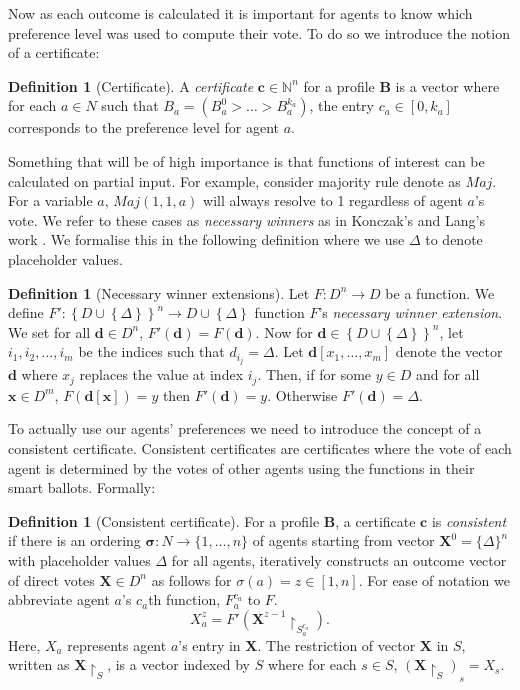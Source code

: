 \documentclass[11pt,a4paper, titlepage]{article}
\theoremstyle{definition}
\newtheorem{definition}[theorem]{Definition}
\let\vec\mathbf
\begin{document}
Now as each outcome is calculated it is important for agents to know which preference level was used to compute their vote. 
To do so we introduce the notion of a certificate:

\begin{definition}[Certificate]
    A \emph{certificate} $\mathbf{c} \in \mathbb{N}^n$ for a profile $\mathbf{B}$ is a vector where for each $a \in N$ such that $B_a = (B_a^0 > \ldots > B_a^{k_a})$, the entry $c_a \in [0, k_a]$ corresponds to the preference level for agent $a$.  
\end{definition}


Something that will be of high importance is that functions of interest can be calculated on partial input.  
For example, consider majority rule denote as $\mathit{Maj}$. For a variable $a$, $\mathit{Maj}(1, 1, a)$ will always resolve to 1 regardless of agent $a$'s vote. 
We refer to these cases as \emph{necessary winners} as in Konczak's and Lang's work \cite{konczak2005voting}.
We formalise this in the following definition where we use $\Delta$ to denote placeholder values.

\begin{definition}[Necessary winner extensions]
    Let $F \colon D^n \longrightarrow D $ be a function.
    We define $F' \colon \left\{D \cup \left\{\Delta\right\}\right\}^n \longrightarrow D \cup \left\{\Delta\right\}$ function $F$'s \emph{necessary winner extension}. 
    We set for all $\vec{d} \in D^n$, $F'(\vec{d}) = F(\vec{d})$.
    Now for $\vec{d} \in \left\{D \cup \left\{\Delta\right\}\right\}^n$, let $i_1, i_2, \ldots, i_m$ be the indices such that $d_{i_j} = \Delta$.
    Let $\vec{d}[x_1, \ldots, x_m]$ denote the vector $\vec{d}$ where $x_j$ replaces the value at index $i_j$. Then, if for some $y \in D$ and for all $\vec{x} \in D^m$, $F(\vec{d}[\vec{x}]) = y$ then $F'(\vec{d}) = y$.
    Otherwise $F'(\vec{d}) = \Delta$.
\end{definition}

To actually use our agents' preferences we need to introduce the concept of a consistent certificate. 
Consistent certificates are certificates where the vote of each agent is determined by the votes of other agents using the functions in their smart ballots. Formally:

\begin{definition}[Consistent certificate]
    For a profile $\mathbf{B}$, a certificate $\mathbf{c}$ is \emph{consistent} if there is an ordering $\mathbf{\sigma} \colon N \longrightarrow \{1,\ldots, n\}$ of agents starting from vector $\vec{X}^0 = \{\Delta\}^n$ with placeholder values $\Delta$ for all agents, iteratively constructs an outcome vector of direct votes $\vec{X} \in D^n$ as follows for $\sigma(a) = z \in [1,n]$. For ease of notation we abbreviate agent $a$'s $c_a$th function, $F_a^{c_a}$ to $F$.
    \[
        X^z_a = F'(\vec{X}^{z-1} \restriction_{S^{c_a}_a} ).
    \]
    Here, $X_a$ represents agent $a$'s entry in $\vec{X}$. 
    The restriction of vector $\vec{X}$ in $S$, written as $\vec{X} \restriction_S$, is a vector indexed by $S$ where for each $s \in S$,  $(\vec{X} \restriction_S)_s = X_s$.


\end{definition}
\end{document}
